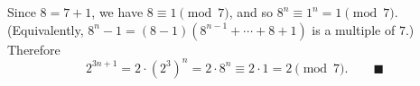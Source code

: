 Since $8=7+1$, we have $8\equiv1\pmod7$, and so $8^n\equiv1^n=1\pmod7$. (Equivalently, $8^n-1=(8-1)\left(8^{n-1}+\cdots+8+1\right)$ is a multiple of $7$.) Therefore
\[2^{3n+1}=2\cdot\left(2^3\right)^n=2\cdot8^n\equiv2\cdot1=2\pmod7.\qquad\blacksquare\]

